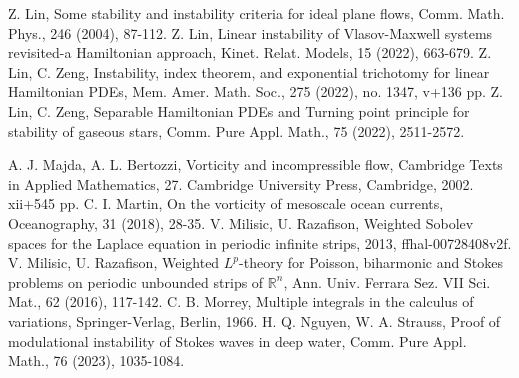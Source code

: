 \documentclass[1 [leqno, 11pt]{amsart}
\numberwithin{equation}{section}
\begin{document}
\begin{CJK*}{GBK}{song}
\begin{thebibliography}{99}
Z. Lin, Some stability and instability criteria for ideal plane flows,  Comm. Math. Phys., 246 (2004),  87-112.
Z. Lin,  Linear instability of Vlasov-Maxwell systems revisited-a Hamiltonian
approach,   Kinet. Relat. Models, 15 (2022), 663-679.
Z. Lin, C. Zeng,  Instability, index theorem, and exponential trichotomy for linear Hamiltonian PDEs, Mem. Amer. Math. Soc., 275 (2022), no. 1347, v+136 pp.
Z. Lin, C. Zeng, Separable Hamiltonian PDEs and Turning point
principle for stability of gaseous stars,  Comm. Pure Appl. Math., 75 (2022),  2511-2572.

A. J. Majda, A. L. Bertozzi,  Vorticity and incompressible flow, Cambridge Texts in Applied Mathematics, 27. Cambridge University Press, Cambridge, 2002. xii+545 pp.
C. I. Martin,   On the vorticity of mesoscale ocean currents,
Oceanography, 31 (2018), 28-35.
V. Milisic, U. Razafison, Weighted Sobolev spaces for the Laplace equation in periodic infinite
strips, 2013, ffhal-00728408v2f.
V. Milisic, U. Razafison, Weighted $L^p$-theory for Poisson, biharmonic and Stokes problems on periodic
unbounded strips of $\mathbb{R}^n$, Ann. Univ. Ferrara Sez. VII Sci. Mat., 62 (2016),  117-142.
 C. B. Morrey, Multiple integrals in the calculus of variations,
Springer-Verlag, Berlin, 1966.
 H. Q. Nguyen, W. A.  Strauss,  Proof of modulational instability of Stokes waves in deep water, Comm. Pure Appl. Math., 76 (2023), 1035-1084.


\end{thebibliography}
\end{CJK*}
\end{document}
